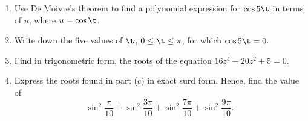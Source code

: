 \begin{problem}
    \begin{enumerate}
        \item Use De Moivre's theorem to find a polynomial expression for $\cos 5\t$ in terms of $u$, where $u = \cos \t$.
        \item Write down the five values of $\t$, $0 \leq \t \leq \pi$, for which $\cos 5\t = 0$.
        \item Find in trigonometric form, the roots of the equation $16z^4 - 20z^2 + 5 = 0$.
        \item Express the roots found in part (c) in exact surd form. Hence, find the value of \[\sin^2 \frac{\pi}{10} + \sin^2 \frac{3\pi}{10} + \sin^2 \frac{7\pi}{10} + \sin^2 \frac{9\pi}{10}.\]
    \end{enumerate}
\end{problem}
